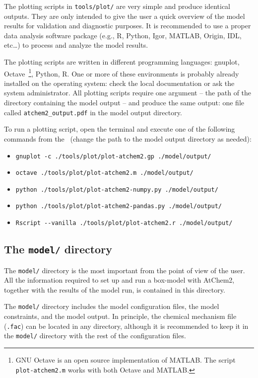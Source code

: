 The plotting scripts in \texttt{tools/plot/} are very simple and
produce identical outputs. They are only intended to give the user a
quick overview of the model results for validation and diagnostic
purposes. It is recommended to use a proper data analysis software
package (e.g., R, Python, Igor, MATLAB, Origin, IDL, etc\ldots) to
process and analyze the model results.

The plotting scripts are written in different programming languages:
gnuplot, Octave~\footnote{GNU Octave is an open source implementation
  of MATLAB. The script \texttt{plot-atchem2.m} works with both Octave
  and MATLAB.}, Python, R. One or more of these environments is
probably already installed on the operating system: check the local
documentation or ask the system administrator. All plotting scripts
require one argument -- the path of the directory containing the model
output -- and produce the same output: one file called
\texttt{atchem2\_output.pdf} in the model output directory.

To run a plotting script, open the terminal and execute one of the
following commands from the \maindir\ (change the path to the model
output directory as needed):

\begin{itemize}
\item \verb|gnuplot -c ./tools/plot/plot-atchem2.gp ./model/output/|
\item \verb|octave ./tools/plot/plot-atchem2.m ./model/output/|
\item \verb|python ./tools/plot/plot-atchem2-numpy.py ./model/output/|
\item \verb|python ./tools/plot/plot-atchem2-pandas.py ./model/output/|
\item \verb|Rscript --vanilla ./tools/plot/plot-atchem2.r ./model/output/|
\end{itemize}

\subsection{The \texttt{model/} directory} \label{subsec:model-directory}

The \texttt{model/} directory is the most important from the point of
view of the user. All the information required to set up and run a
box-model with AtChem2, together with the results of the model run, is
contained in this directory.

The \texttt{model/} directory includes the model configuration files,
the model constraints, and the model output. In principle, the
chemical mechanism file (\texttt{.fac}) can be located in any
directory, although it is recommended to keep it in the
\texttt{model/} directory with the rest of the configuration files.

